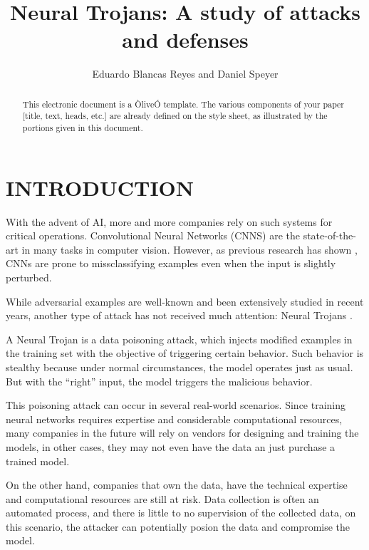 \documentclass[letterpaper, 10 pt, conference]{ieeeconf}  %
\title{\LARGE \bf
Neural Trojans: A study of attacks and defenses
}
\author{Eduardo Blancas Reyes and Daniel Speyer%
}
\begin{document}
\maketitle
\thispagestyle{empty}
\pagestyle{empty}


\begin{abstract}

This electronic document is a ÒliveÓ template. The various components of your paper [title, text, heads, etc.] are already defined on the style sheet, as illustrated by the portions given in this document.

\end{abstract}


\section{INTRODUCTION}

With the advent of AI, more and more companies rely on such systems for critical operations. Convolutional Neural Networks (CNNS) are the state-of-the-art in many tasks in computer vision. However, as previous research has shown \cite{adversarial, adversarial2}, CNNs are prone to missclassifying examples even when the input is slightly perturbed.

While adversarial examples are well-known and been extensively studied in recent years, another type of attack has not received much attention: Neural Trojans \cite{trojan, trojan2}.

A Neural Trojan is a data poisoning attack, which injects modified examples in the training set with the objective of triggering certain behavior. Such behavior is stealthy because under normal circumstances, the model operates just as usual.  But with the ``right'' input, the model triggers the malicious behavior.

This poisoning attack can occur in several real-world scenarios. Since training neural networks requires expertise and considerable computational resources, many companies in the future will rely on vendors for designing and training the models, in other cases, they may not even have the data an just purchase a trained model.

On the other hand, companies that own the data, have the technical expertise and computational resources are still at risk. Data collection is often an automated process, and there is little to no supervision of the collected data, on this scenario, the attacker can potentially posion the data and compromise the model.
\end{document}
